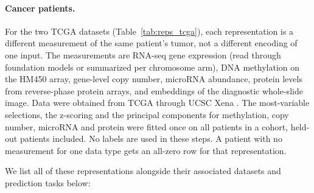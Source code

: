 \paragraph{Cancer patients.} For the two TCGA datasets (Table~\ref{tab:reps_tcga}), each representation is a different measurement of the same patient's tumor, not a different encoding of one input. The measurements are RNA-seq gene expression (read through foundation models or summarized per chromosome arm), DNA methylation on the HM450 array, gene-level copy number, microRNA abundance, protein levels from reverse-phase protein arrays, and embeddings of the diagnostic whole-slide image. Data were obtained from TCGA through UCSC Xena \citep{TCGA2013, Goldman2020}. The most-variable selections, the z-scoring and the principal components for methylation, copy number, microRNA and protein were fitted once on all patients in a cohort, held-out patients included. No labels are used in these steps. A patient with no measurement for one data type gets an all-zero row for that representation.

We list all of these representations alongside their associated datasets and prediction tasks below:

